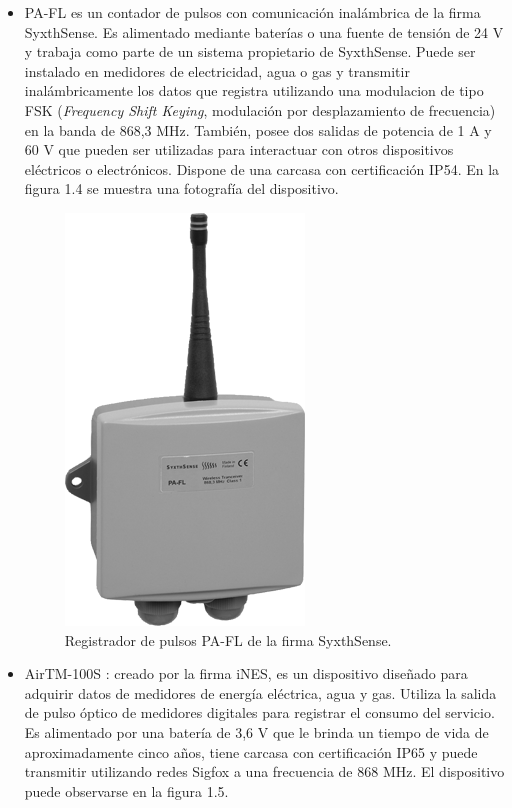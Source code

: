 \begin{itemize}
	\item PA-FL \citep{WEBSITE:6} es un contador de pulsos con comunicación inalámbrica de la firma SyxthSense. Es alimentado mediante baterías o una fuente de tensión de 24 V y trabaja como parte de un sistema propietario de SyxthSense. Puede ser instalado en medidores de electricidad, agua o gas y transmitir inalámbricamente los datos que registra utilizando una modulacion de tipo FSK (\textit{Frequency Shift Keying}, modulación por desplazamiento de frecuencia) en la banda de 868,3 MHz. También, posee dos salidas de potencia de 1 A y 60 V que pueden ser utilizadas para interactuar con otros dispositivos eléctricos o electrónicos. Dispone de una carcasa con certificación IP54. En la figura 1.4 se muestra una fotografía del dispositivo.
	
	\begin{figure}[h]
		\centering
		\includegraphics[scale=0.47]{./Figures/PA-FL.png}
		\caption{Registrador de pulsos PA-FL de la firma SyxthSense\protect\footnotemark.}
		\label{fig:cuadradoAzul}
	\end{figure}
	

	\item AirTM-100S \citep{WEBSITE:7}: creado por la firma iNES, es un dispositivo diseñado para adquirir datos de medidores de energía eléctrica, agua y gas. Utiliza la salida de pulso óptico de medidores digitales para registrar el consumo del servicio. Es alimentado por una batería de 3,6 V que le brinda un tiempo de vida de aproximadamente cinco años, tiene carcasa con certificación IP65 y puede transmitir utilizando redes Sigfox \citep{WEBSITE:13} a una frecuencia de 868 MHz. El dispositivo puede observarse en la figura 1.5.
	

\end{itemize}
